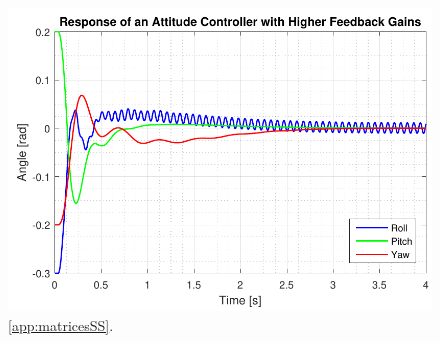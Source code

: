 
\begin{figure}[H]
	\centering
	\includegraphics[scale=1]{figures/ssEqBad.pdf}
	\caption{\autoref{app:matricesSS}.}
	\label{fig:TranslationalControlDiagram}
\end{figure}

